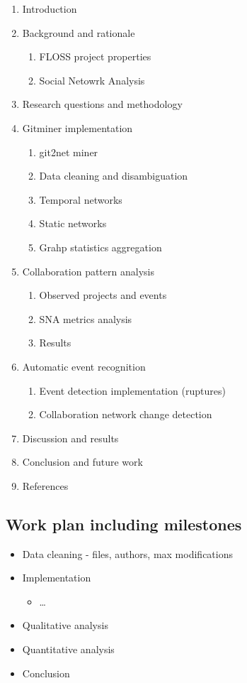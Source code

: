 \begin{enumerate}[label*=\arabic*.]
    \item Introduction
    \item Background and rationale
    \begin{enumerate}[label*=\arabic*.]
        \item FLOSS project properties
        \item Social Netowrk Analysis 
    \end{enumerate}
    \item Research questions and methodology
    \item Gitminer implementation
    \begin{enumerate}[label*=\arabic*.]
        \item git2net miner
        \item Data cleaning and disambiguation
        \item Temporal networks
        \item Static networks
        \item Grahp statistics aggregation
    \end{enumerate}
    \item Collaboration pattern analysis
    \begin{enumerate}[label*=\arabic*.]
        \item Observed projects and events
        \item SNA metrics analysis
        \item Results
    \end{enumerate}
    \item Automatic event recognition
    \begin{enumerate}[label*=\arabic*.]
        \item Event detection implementation (ruptures)
        \item Collaboration network change detection
    \end{enumerate}
    \item Discussion and results
    \item Conclusion and future work
    \item References
\end{enumerate}

\subsection{Work plan including milestones}

\begin{itemize}
    \item Data cleaning - files, authors, max modifications
    \item Implementation
    \begin{itemize}
        \item \dots
    \end{itemize}
    \item Qualitative analysis
    \item Quantitative analysis
    \item Conclusion
\end{itemize}